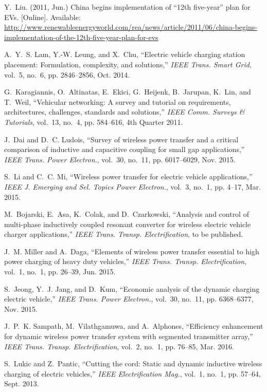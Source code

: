 \documentclass[journal]{IEEEtran}
\begin{document}
\begin{thebibliography}{1}
Y.~Liu. (2011, Jun.) China begins implementation of ``12th five-year'' plan for
  {EVs}. [Online]. Available:
  \url{http://www.renewableenergyworld.com/rea/news/article/2011/06/china-begins-implementation-of-the-12th-five-year-plan-for-evs}


A.~Y.~S. Lam, Y.-W. Leung, and X.~Chu, ``Electric vehicle charging station
  placement: Formulation, complexity, and solutions,'' \emph{{IEEE} Trans.
  Smart Grid}, vol.~5, no.~6, pp. 2846--2856, Oct. 2014.

G.~Karagiannis, O.~Altinatas, E.~Ekici, G.~Heijenk, B.~Jarupan, K.~Lin, and
  T.~Weil, ``Vehicular networking: A survey and tutorial on requirements,
  architectures, challenges, standards and solutions,'' \emph{IEEE Comm.
  Surveys \& Tutorials}, vol.~13, no.~4, pp. 584--616, 4th Quarter 2011.

J.~Dai and D.~C. Ludois, ``Survey of wireless power transfer and a critical
  comparison of inductive and capacitive coupling for small gap applications,''
  \emph{{IEEE} Trans. Power Electron.}, vol.~30, no.~11, pp. 6017--6029, Nov.
  2015.

S.~Li and C.~C. Mi, ``Wireless power transfer for electric vehicle
  applications,'' \emph{{IEEE} J. Emerging and Sel. Topics Power Electron.},
  vol.~3, no.~1, pp. 4--17, Mar. 2015.

M.~Bojarski, E.~Asa, K.~Colak, and D.~Czarkowski, ``Analysis and control of
  multi-phase inductively coupled resonant converter for wireless electric
  vehicle charger applications,'' \emph{IEEE Trans. Transp. Electrification},
  to be published.

J.~M. Miller and A.~Daga, ``Elements of wireless power transfer essential to
  high power charging of heavy duty vehicles,'' \emph{IEEE Trans. Transp.
  Electrification}, vol.~1, no.~1, pp. 26--39, Jun. 2015.

S.~Jeong, Y.~J. Jang, and D.~Kum, ``Economic analysis of the dynamic charging
  electric vehicle,'' \emph{{IEEE} Trans. Power Electron.}, vol.~30, no.~11,
  pp. 6368--6377, Nov. 2015.

J.~P.~K. Sampath, M.~Vilathgamuwa, and A.~Alphones, ``Efficiency enhancement
  for dynamic wireless power transfer system with segmented transmitter
  array,'' \emph{IEEE Trans. Transp. Electrification}, vol.~2, no.~1, pp.
  76--85, Mar. 2016.

S.~Lukic and Z.~Pantic, ``Cutting the cord: Static and dynamic inductive
  wireless charging of electric vehicles,'' \emph{IEEE Electrification Mag.},
  vol.~1, no.~1, pp. 57--64, Sept. 2013.


\end{thebibliography}
\end{document}
